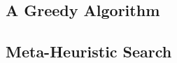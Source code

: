 \subsection{A Greedy Algorithm}
\begin{frame}{\insertsubsection}
\end{frame}

\subsection{Meta-Heuristic Search}

